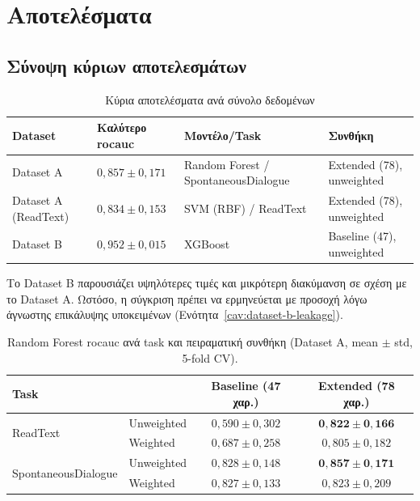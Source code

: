 
\chapter{Αποτελέσματα}
\label{ch:results}

\section{Σύνοψη κύριων αποτελεσμάτων}

\begin{table}[H]
\centering
\small
\begin{tabular}{@{}p{2.5cm}p{2.6cm}p{3.2cm}p{3.3cm}@{}}
\toprule
\textbf{Dataset} & \textbf{Καλύτερο \gls{rocauc}} & \textbf{Μοντέλο/Task} & \textbf{Συνθήκη} \\
\midrule
Dataset A & $0{,}857 \pm 0{,}171$ & Random Forest / SpontaneousDialogue & Extended (78), unweighted \\
Dataset A (ReadText) & $0{,}834 \pm 0{,}153$ & SVM (RBF) / ReadText & Extended (78), unweighted \\
Dataset B & $0{,}952 \pm 0{,}015$ & XGBoost & Baseline (47), unweighted \\
\bottomrule
\end{tabular}
\caption{Κύρια αποτελέσματα ανά σύνολο δεδομένων}
\label{tab:best-results-summary}
\end{table}

Το Dataset B παρουσιάζει υψηλότερες τιμές και μικρότερη διακύμανση σε σχέση με το Dataset A. Ωστόσο, η σύγκριση πρέπει να ερμηνεύεται με προσοχή λόγω άγνωστης επικάλυψης υποκειμένων (Ενότητα~\ref{cav:dataset-b-leakage}).

\begin{table}[H]
\centering
\caption{Random Forest \gls{rocauc} ανά task και πειραματική συνθήκη (Dataset A, mean $\pm$ std, 5-fold CV).}
\label{tab:rf-rocauc-main}
\begin{tabular}{@{}llcc@{}}
\toprule
\textbf{Task} & & \textbf{Baseline (47 χαρ.)} & \textbf{Extended (78 χαρ.)} \\
\midrule
\multirow{2}{*}{ReadText}
& Unweighted & $0{,}590 \pm 0{,}302$ & $\mathbf{0{,}822 \pm 0{,}166}$ \\
& Weighted & $0{,}687 \pm 0{,}258$ & $0{,}805 \pm 0{,}182$ \\
\midrule
\multirow{2}{*}{SpontaneousDialogue}
& Unweighted & $0{,}828 \pm 0{,}148$ & $\mathbf{0{,}857 \pm 0{,}171}$ \\
& Weighted & $0{,}827 \pm 0{,}133$ & $0{,}823 \pm 0{,}209$ \\
\bottomrule
\end{tabular}
\end{table}

